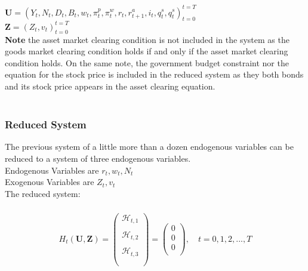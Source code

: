 \documentclass[titlepage]{\econtex}\providecommand{\texname}{BufferStockTheory}
\begin{document}
 
 
 $\mathbf{U} = \left(Y_{t} , N_{t} ,  D_{t
 }, B_{t}, w_{t} , \pi_{t}^{p} ,\pi_{t}^{w}, r_{t} , r_{t+1}^{a}, i_{t} , q_{t}^{s},  q_{t}^{s} \right)_{t=0}^{t=T}$ \\ 

 
 $\mathbf{Z} = \left(Z_{t} ,v_{t}\right)_{t=0}^{t=T}$ \\
 
 \textbf{Note} the asset market clearing condition is not included in the system as the goods market clearing condition holds if and only if the asset market clearing condition holds. On the same note, the government budget constraint nor the equation for the stock price is included in the reduced system as they both bonds and its stock price appears in the asset clearing equation.  \\ \\
 
 
 
\hypertarget{Reduced System}{}
\subsubsection{Reduced System}
 
The previous system of a little more than a dozen endogenous variables can be reduced to a system of three endogenous variables. \\ 
 
Endogenous Variables are $ r_{t} , w_{t} ,N_{t}$ \\ 
 
Exogenous Variables are $ Z_{t}, v_{t}$ \\ 

The reduced system: \\ \\

\begin{eqnarray} 
H_{t}(\mathbf{U},\mathbf{Z})= \begin{pmatrix} 
\mathcal{H}_{t,1} \\ \\ 
\mathcal{H}_{t,2} \\ \\
\mathcal{H}_{t,3} \\ \\
 \end{pmatrix} = \begin{pmatrix} 0 \\ 0 \\ 0 \\ \end{pmatrix} , \quad  t = 0, 1, 2, ..., T 
 \end{eqnarray}
 
\end{document}
